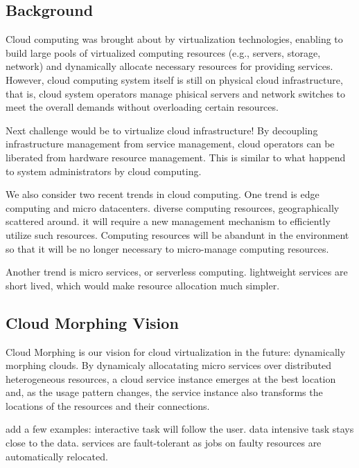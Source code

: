 \subsection{Background}

Cloud computing was brought about by virtualization technologies,
enabling to build large pools of virtualized computing resources (e.g.,
servers, storage, network) and dynamically allocate necessary resources
for providing services.
However, cloud computing system itself is still on physical cloud
infrastructure, that is, cloud system operators manage phisical
servers and network switches to meet the overall demands without
overloading certain resources.

Next challenge would be to virtualize cloud infrastructure!
By decoupling infrastructure management from service management,
cloud operators can be liberated from hardware resource management.
This is similar to what happend to system administrators by cloud
computing.

We also consider two recent trends in cloud computing.
One trend is edge computing and micro datacenters.
diverse computing resources, geographically scattered around.
it will require a new management mechanism to efficiently utilize such
resources.
Computing resources will be abandunt in the environment so that it
will be no longer necessary to micro-manage computing resources.

Another trend is micro services, or serverless computing.
lightweight services are short lived, which would make resource
allocation much simpler.


\subsection{Cloud Morphing Vision}

Cloud Morphing is our vision for cloud virtualization in the future:
dynamically morphing clouds.
By dynamicaly allocatating micro services over distributed
heterogeneous resources, a cloud service instance emerges at the best
location and, as the usage pattern changes, the service instance also
transforms the locations of the resources and their connections.

add a few examples: interactive task will follow the user.  data
intensive task stays close to the data. services are fault-tolerant as
jobs on faulty resources are automatically relocated.

